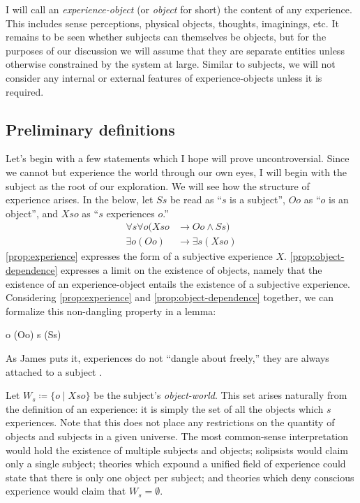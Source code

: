 \documentclass[leqno]{article}
\newcounter{lemma}
\begin{document}
	I will call an \emph{experience-object} (or \emph{object} for short) the content
	of any experience. This includes sense perceptions, physical objects, thoughts,
	imaginings, etc. It remains to be seen whether subjects can themselves be objects,
	but for the purposes of our discussion we will assume that they are separate
	entities unless otherwise constrained by the system at large. Similar to subjects,
	we will not consider any internal or external features of experience-objects
	unless it is required.

	\subsection{Preliminary definitions}

	Let's begin with a few statements which I hope will prove uncontroversial.
	Since we cannot but experience the world through our own eyes, I will begin with
	the subject as the root of our exploration. We will see how the structure of
	experience arises. In the below, let $Ss$ be read as \enquote{$s$ is a subject},
	$Oo$ as \enquote{$o$ is an object}, and $Xso$ as \enquote{$s$ experiences $o$.}%
	\begin{align}
		\label{prop:experience}\forall s \forall o (Xso & \rightarrow Oo \land Ss)    \\
		\label{prop:object-dependence}\exists o (Oo)    & \rightarrow \exists s (Xso)
	\end{align}%
	\eqref{prop:experience} expresses the form of a subjective experience $X$. \eqref{prop:object-dependence}
	expresses a limit on the existence of objects, namely that the existence of an
	experience-object entails the existence of a subjective experience.
	Considering \eqref{prop:experience} and \eqref{prop:object-dependence}
	together, we can formalize this non-dangling property in a lemma:%
	\begin{lemmalist}
		\label{lemma:object-dependence} \exists o (Oo) \rightarrow \exists s (Ss)
	\end{lemmalist}%
	As James puts it, experiences do not \enquote{dangle about freely,} they are
	always attached to a subject \autocite{james1983}.

	Let $W_{s}\coloneq \{ o \mid Xso \}$ be the subject's \emph{object-world}. This
	set arises naturally from the definition of an experience: it is simply the
	set of all the objects which $s$ experiences. Note that this does not place any
	restrictions on the quantity of objects and subjects in a given universe. The
	most common-sense interpretation would hold the existence of multiple subjects
	and objects; solipsists would claim only a single subject; theories which
	expound a unified field of experience could state that there is only one
	object per subject; and theories which deny conscious experience would claim that
	$W_{s}= \emptyset$.
\end{document}
